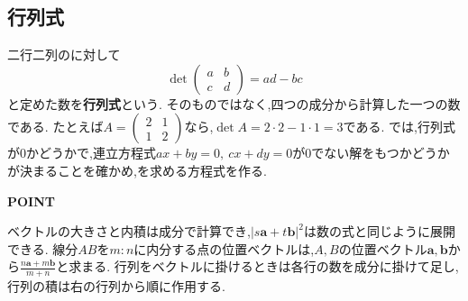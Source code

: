 \subsection{行列式}\label{節：行列式}
二行二列のに対して
\[
  \det\begin{pmatrix}a&b\\c&d\end{pmatrix}=ad-bc
\]
と定めた数を\textbf{行列式}という.
そのものではなく,四つの成分から計算した一つの数である.
たとえば$A=\begin{pmatrix}2&1\\1&2\end{pmatrix}$なら,$\det A=2\cdot2-1\cdot1=3$である.
では,行列式が$0$かどうかで,連立方程式$ax+by=0,\ cx+dy=0$が0でない解をもつかどうかが決まることを確かめ,を求める方程式を作る.

\begin{bookpoint}
  \textbf{POINT}\par
  ベクトルの大きさと内積は成分で計算でき,$|s\boldsymbol a+t\boldsymbol b|^2$は数の式と同じように展開できる.
  線分$AB$を$m:n$に内分する点の位置ベクトルは,$A,B$の位置ベクトル$\boldsymbol a,\boldsymbol b$から$\frac{n\boldsymbol a+m\boldsymbol b}{m+n}$と求まる.
  行列をベクトルに掛けるときは各行の数を成分に掛けて足し,行列の積は右の行列から順に作用する.
\end{bookpoint}
